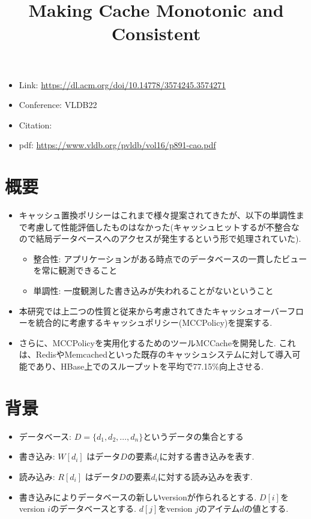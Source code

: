 \documentclass[dvipdfmx,uplatex]{jsarticle}
\title{Making Cache Monotonic and Consistent}
\author{\empty}
\date{\empty}
\theoremstyle{remark}
\newenvironment{simplebox}{
    \begin{tcolorbox}[
        fonttitle=\bfseries,
    ]
}{
    \end{tcolorbox}
}
\begin{document}
\maketitle

\begin{itemize}
    \item Link: \url{https://dl.acm.org/doi/10.14778/3574245.3574271}
    \item Conference: VLDB22
    \item Citation: \cite{cache-consistent}
    \item pdf: \url{https://www.vldb.org/pvldb/vol16/p891-cao.pdf}
\end{itemize}


\section{概要}
\begin{simplebox}
\begin{itemize}
    \item キャッシュ置換ポリシーはこれまで様々提案されてきたが、以下の単調性まで考慮して性能評価したものはなかった(キャッシュヒットするが不整合なので結局データベースへのアクセスが発生するという形で処理されていた).
    \begin{itemize}
        \item 整合性: アプリケーションがある時点でのデータベースの一貫したビューを常に観測できること
        \item 単調性: 一度観測した書き込みが失われることがないということ
    \end{itemize}
    \item 本研究では上二つの性質と従来から考慮されてきたキャッシュオーバーフローを統合的に考慮するキャッシュポリシー(MCCPolicy)を提案する.
    \item さらに、MCCPolicyを実用化するためのツールMCCacheを開発した. これは、RedisやMemcachedといった既存のキャッシュシステムに対して導入可能であり、HBase上でのスループットを平均で77.15\%向上させる.
\end{itemize}
\end{simplebox}

\section{背景}
\begin{simplebox}
\begin{itemize}
    \item データベース: $D = \{d_1, d_2, \dots, d_n\}$というデータの集合とする
    \item 書き込み: $W[d_i]$ はデータ$D$の要素$d_i$に対する書き込みを表す.
    \item 読み込み: $R[d_i]$ はデータ$D$の要素$d_i$に対する読み込みを表す.
    \item 書き込みによりデータベースの新しいversionが作られるとする. $D[i]$をversion $i$のデータベースとする. $d[j]$をversion $j$のアイテム$d$の値とする.
\end{itemize}
\end{simplebox}
\end{document}
